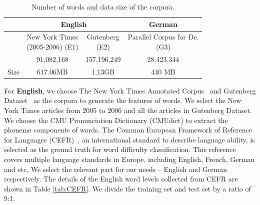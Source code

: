 \begin{table}[th]
	\begin{center}
		\scriptsize
		\begin{tabular}{|c|c|c||c|}
			\hline
			\textbf{} & \multicolumn{2}{c||}{\textbf{English}} & \textbf{German} \\ \hline
			& \tabincell{c}{New York Times\\(2005-2006) (E1)}       & \tabincell{c}{Gutenberg \\ (E2)}   & \tabincell{c}{Parallel Corpus for De. \\(G3)} \\ \hline
			\tabincell{c}{Words}   & 91,082,168          & 157,196,249   & 28,423,344               \\ \hline
			Size        & 617.06MB  & 1.13GB         & 440 MB          \\ \hline
		\end{tabular}
	\end{center}
	\vspace{-0.45cm}
	\caption{\label{tab:corpus} Number of words and data size of the corpora.}
\end{table}

For \textbf{English}, we choose The New York Times Annotated Corpus~\cite{Evan2008newyork} and Gutenberg Dataset~\cite{lahiri:2014:SRW} as the corpora to generate the features of words.
We select the New York Times articles from 2005 to 2006 and all the articles in Gutenberg Dataset.
We choose the CMU Pronunciation Dictionary (CMUdict) to extract the phoneme components of words.
The Common European Framework of Reference for Languages  (CEFR)~\cite{little2006common, little2011common}, an international standard to describe language ability, is selected as the ground truth for word difficulty classification. 
This reference covers multiple language standards in Europe, including English, French, German and etc.
We select the relevant part for our needs -- English and German respectively.
The details of the English word levels collected from CEFR are 
shown in Table \ref{tab:CEFR}.
We divide the training set and test set by a ratio of 9:1.


